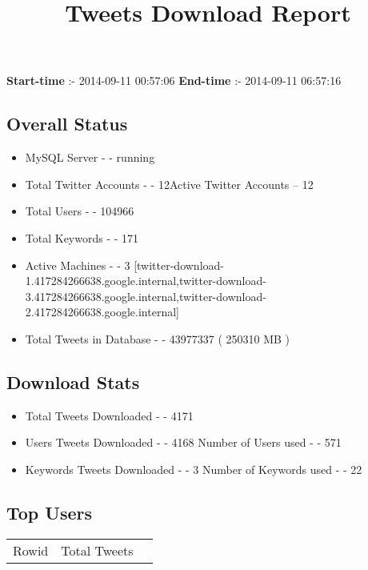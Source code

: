 \documentclass{article}\usepackage[T1]{fontenc}
\begin{document}
\title{\textbf{Tweets Download Report}}
               \date{}
                \maketitle
               \centerline{\textbf{Start-time} :- 2014-09-11 00:57:06 \hspace{40pt} \textbf{End-time} :- 2014-09-11 06:57:16}               \subsection*{Overall Status}                \begin{itemize}                \item MySQL Server - - running               \item Total Twitter Accounts - - 12\newline Active Twitter Accounts -- 12               \item Total Users - - 104966               \item Total Keywords - - 171               \item Active Machines - - 3 [twitter-download-1.417284266638.google.internal,twitter-download-3.417284266638.google.internal,twitter-download-2.417284266638.google.internal]               \item Total Tweets in Database - - 43977337 ( 250310 MB )               \end{itemize}               \subsection*{Download Stats}                \begin{itemize}                \item Total Tweets Downloaded - - 4171               \item Users Tweets Downloaded - - 4168 \newline Number of Users used - - 571               \item Keywords Tweets Downloaded - - 3 \newline Number of Keywords used - - 22              \end{itemize}              \subsection*{Top Users}\begin{tabular}{|c|c|c|}         \hline         Rowid & Total Tweets \\ 

\end{tabular}
\end{document}
